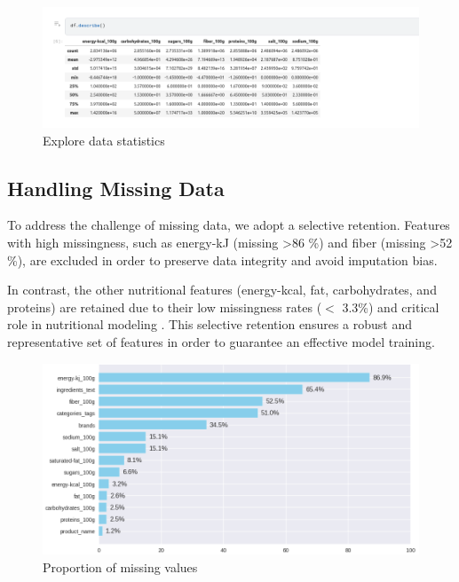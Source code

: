 \begin{figure}[H]
\centering
\includegraphics[scale=0.55]{images/statistics.png}
\caption{Explore data statistics} 
\label{fig:data_statistics}
\end{figure}

\subsection{Handling Missing Data}
To address the challenge of missing data, we adopt a selective retention. Features with high missingness, such as energy-kJ  (missing >86 \%) and fiber (missing >52 \%), are excluded in order to preserve data integrity and avoid imputation bias. 
\par In contrast, the other nutritional features (energy-kcal, fat, carbohydrates, and proteins) are retained due to their low missingness rates  ($<$ 3.3\%) and critical role in nutritional modeling \cite{stoian2020machine}.
This selective retention ensures a robust and representative set of features in order to guarantee an effective model training.

\begin{figure}[H]
\centering
\includegraphics[scale=0.51]{images/missing_values.png}
\caption{Proportion of missing values} 
\label{fig:missing_values}
\end{figure}


